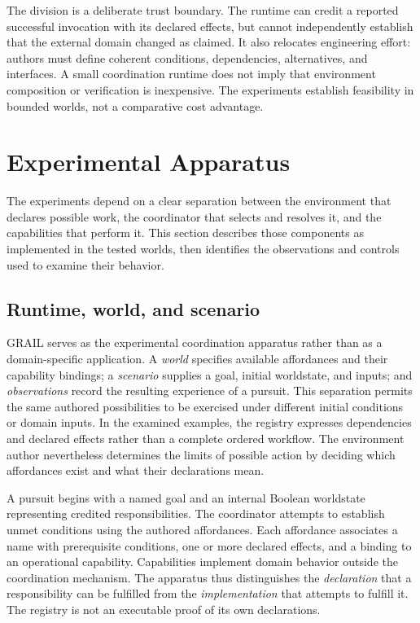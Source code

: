 \documentclass[11pt]{article}
\begin{document}
The division is a deliberate trust boundary. The runtime can credit a reported successful invocation with its declared effects, but cannot independently establish that the external domain changed as claimed. It also relocates engineering effort: authors must define coherent conditions, dependencies, alternatives, and interfaces. A small coordination runtime does not imply that environment composition or verification is inexpensive. The experiments establish feasibility in bounded worlds, not a comparative cost advantage.

\section{Experimental Apparatus}
The experiments depend on a clear separation between the environment that declares possible work, the coordinator that selects and resolves it, and the capabilities that perform it. This section describes those components as implemented in the tested worlds, then identifies the observations and controls used to examine their behavior.

\subsection{Runtime, world, and scenario}
GRAIL serves as the experimental coordination apparatus rather than as a domain-specific application. A \emph{world} specifies available affordances and their capability bindings; a \emph{scenario} supplies a goal, initial worldstate, and inputs; and \emph{observations} record the resulting experience of a pursuit. This separation permits the same authored possibilities to be exercised under different initial conditions or domain inputs. In the examined examples, the registry expresses dependencies and declared effects rather than a complete ordered workflow. The environment author nevertheless determines the limits of possible action by deciding which affordances exist and what their declarations mean.

A pursuit begins with a named goal and an internal Boolean worldstate representing credited responsibilities. The coordinator attempts to establish unmet conditions using the authored affordances. Each affordance associates a name with prerequisite conditions, one or more declared effects, and a binding to an operational capability. Capabilities implement domain behavior outside the coordination mechanism. The apparatus thus distinguishes the \emph{declaration} that a responsibility can be fulfilled from the \emph{implementation} that attempts to fulfill it. The registry is not an executable proof of its own declarations.
\end{document}
